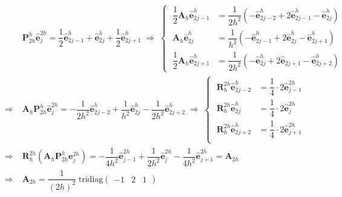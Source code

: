 \documentclass[12pt, UTF8, nofonts]{ctexart}
\begin{document}
\begin{equation}
  \label{eq:coarsegrid}
  \begin{aligned}
    & \boldsymbol{P}_{2h}^{h}\hat{\boldsymbol{e}}_j^{2h} = \dfrac{1}{2}\hat{\boldsymbol{e}}_{2j-1}^h + \hat{\boldsymbol{e}}_{2j}^h + \dfrac{1}{2}\hat{\boldsymbol{e}}_{2j+1}^h \;\Rightarrow\;
    \left\{\; \begin{aligned}
      \dfrac{1}{2}\boldsymbol{A}_{h}\hat{\boldsymbol{e}}_{2j-1}^h &= \dfrac{1}{2h^2}\left( -\hat{\boldsymbol{e}}_{2j-2}^{h} + 2\hat{\boldsymbol{e}}_{2j-1}^{h} - \hat{\boldsymbol{e}}_{2j}^{h} \right) \\
      \boldsymbol{A}_h\hat{\boldsymbol{e}}_{2j}^{h} &= \dfrac{1}{h^2}\left(-\hat{\boldsymbol{e}}_{2j-1}^{h} + 2\hat{\boldsymbol{e}}_{2j}^{h} - \hat{\boldsymbol{e}}_{2j+1}^{h}\right) \\
      \dfrac{1}{2}\boldsymbol{A}_{h}\hat{\boldsymbol{e}}_{2j+1}^{h} &= \dfrac{1}{2h^2}\left( -\hat{\boldsymbol{e}}_{2j}^{h} + 2 \hat{\boldsymbol{e}}_{2j+1} - \hat{\boldsymbol{e}}_{2j+2}^{h}\right)
    \end{aligned}\right. \\
    \Rightarrow\;&\boldsymbol{A}_h\boldsymbol{P}_{2h}^h\hat{\boldsymbol{e}}_{j}^{2h} = -\dfrac{1}{2h^2}\hat{\boldsymbol{e}}_{2j-2}^h + \dfrac{1}{h^2}\hat{\boldsymbol{e}}_{2j}^{h} - \dfrac{1}{2h^2}\hat{\boldsymbol{e}}_{2j+2}^{h} \;\Rightarrow\;
    \left\{\; \begin{aligned}
      \boldsymbol{R}_{h}^{2h}\hat{\boldsymbol{e}}_{2j-2}^h &= \dfrac{1}{4}\cdot2\hat{\boldsymbol{e}}_{j-1}^{2h} \\
      \boldsymbol{R}_{h}^{2h}\hat{\boldsymbol{e}}_{2j}^h &= \dfrac{1}{4}\cdot2\hat{\boldsymbol{e}}_{j}^{2h} \\
      \boldsymbol{R}_{h}^{2h}\hat{\boldsymbol{e}}_{2j+2}^h &= \dfrac{1}{4}\cdot2\hat{\boldsymbol{e}}_{j+1}^{2h} \\
    \end{aligned}\right.\\
    \Rightarrow\;& \boldsymbol{R}_{h}^{2h}\left(\boldsymbol{A}_h\boldsymbol{P}_{2h}^{h}\boldsymbol{e}_{j}^{2h}\right) = -\dfrac{1}{4h^2}\hat{\boldsymbol{e}}_{j-1}^{2h} + \dfrac{1}{2h^2}\hat{\boldsymbol{e}}_{j}^{2h} - \dfrac{1}{4h^2}\hat{\boldsymbol{e}}_{j+1}^{2h} = \boldsymbol{A}_{2h} \\
    \Rightarrow\;& \boldsymbol{A}_{2h} = \dfrac{1}{(2h)^2} \; \mathrm{tridiag}
    \begin{pmatrix} -1 & 2 & 1\end{pmatrix}
  \end{aligned}
\end{equation}
\end{document}
